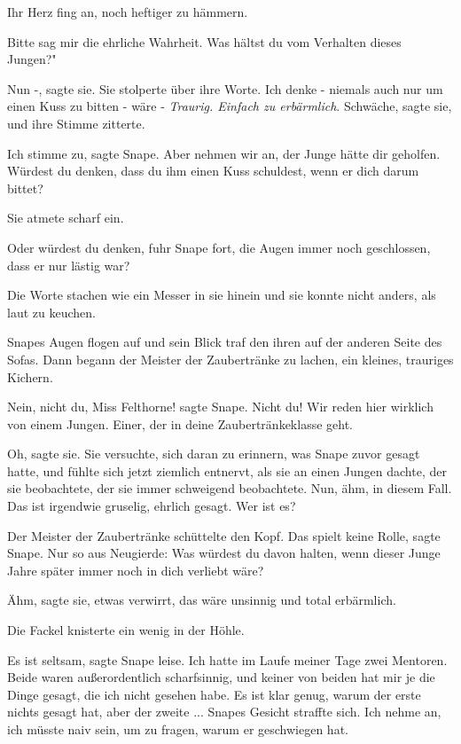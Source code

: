 Ihr Herz fing an, noch heftiger zu hämmern.

\glqq{}Bitte sag mir die ehrliche Wahrheit. Was hältst du vom Verhalten dieses
Jungen?"

\glqq{}Nun -\grqq{}, sagte sie. Sie stolperte über ihre Worte. \glqq{}Ich denke -
niemals auch nur um einen Kuss zu bitten - wäre -\grqq{} \emph{Traurig. Einfach
zu erbärmlich}. \glqq{}Schwäche\grqq{}, sagte sie, und ihre Stimme zitterte.

\glqq{}Ich stimme zu\grqq{}, sagte Snape. \glqq{}Aber nehmen wir an, der Junge
hätte dir geholfen. Würdest du denken, dass du ihm einen Kuss schuldest, wenn er
dich darum bittet?\grqq{}

Sie atmete scharf ein.

\glqq{}Oder würdest du denken\grqq{}, fuhr Snape fort, die Augen immer noch
geschlossen, \glqq{}dass er nur lästig war?\grqq{}

Die Worte stachen wie ein Messer in sie hinein und sie konnte nicht anders, als
laut zu keuchen.

Snapes Augen flogen auf und sein Blick traf den ihren auf der anderen Seite des
Sofas. Dann begann der Meister der Zaubertränke zu lachen, ein kleines,
trauriges Kichern.

\glqq{}Nein, nicht du, Miss Felthorne!\grqq{} sagte Snape. \glqq{}Nicht du! Wir
reden hier wirklich von einem Jungen. Einer, der in deine Zaubertränkeklasse
geht.\grqq{}

\glqq{}Oh\grqq{}, sagte sie. Sie versuchte, sich daran zu erinnern, was Snape
zuvor gesagt hatte, und fühlte sich jetzt ziemlich entnervt, als sie an einen
Jungen dachte, der sie beobachtete, der sie immer schweigend beobachtete. \glqq{}
Nun, ähm, in diesem Fall. Das ist irgendwie gruselig, ehrlich gesagt. Wer ist
es?\grqq{}

Der Meister der Zaubertränke schüttelte den Kopf. \glqq{}Das spielt keine
Rolle\grqq{}, sagte Snape. \glqq{}Nur so aus Neugierde: Was würdest du davon
halten, wenn dieser Junge Jahre später immer noch in dich verliebt wäre?\grqq{}

\glqq{}Ähm\grqq{}, sagte sie, etwas verwirrt, \glqq{}das wäre unsinnig und total
erbärmlich.\grqq{}

Die Fackel knisterte ein wenig in der Höhle.

\glqq{}Es ist seltsam\grqq{}, sagte Snape leise. \glqq{}Ich hatte im Laufe meiner
Tage zwei Mentoren. Beide waren außerordentlich scharfsinnig, und keiner von
beiden hat mir je die Dinge gesagt, die ich nicht gesehen habe. Es ist klar
genug, warum der erste nichts gesagt hat, aber der zweite ...\grqq{} Snapes
Gesicht straffte sich. \glqq{}Ich nehme an, ich müsste naiv sein, um zu fragen,
warum er geschwiegen hat.\grqq{}


